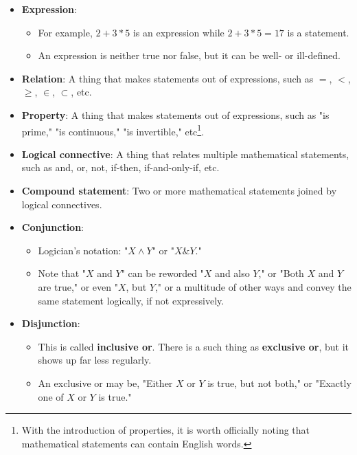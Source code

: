 \documentclass[../main.tex]{subfiles}
\begin{document}
\begin{itemize}
    \item \textbf{Expression}: 
    \begin{itemize}
        \item For example, $2+3*5$ is an expression while $2+3*5=17$ is a statement.
        \item An expression is neither true nor false, but it can be well- or ill-defined.
    \end{itemize}
    \item \textbf{Relation}: A thing that makes statements out of expressions, such as $=$, $<$, $\geq$, $\in$, $\subset$, etc.
    \item \textbf{Property}: A thing that makes statements out of expressions, such as "is prime," "is continuous," "is invertible," etc\footnote{With the introduction of properties, it is worth officially noting that mathematical statements can contain English words.}.
    \item \textbf{Logical connective}: A thing that relates multiple mathematical statements, such as and, or, not, if-then, if-and-only-if, etc.
    \item \textbf{Compound statement}: Two or more mathematical statements joined by logical connectives.
    \item \textbf{Conjunction}: 
    \begin{itemize}
        \item Logician's notation: "$X\wedge Y$" or "$X\& Y$."
        \item Note that "$X$ and $Y$" can be reworded "$X$ and also $Y$," or "Both $X$ and $Y$ are true," or even "$X$, but $Y$," or a multitude of other ways and convey the same statement logically, if not expressively.
    \end{itemize}
    \item \textbf{Disjunction}: 
    \begin{itemize}
        \item This is called \textbf{inclusive or}. There is a such thing as \textbf{exclusive or}, but it shows up far less regularly.
        \item An exclusive or may be, "Either $X$ or $Y$ is true, but not both," or "Exactly one of $X$ or $Y$ is true."

\end{itemize}
\end{itemize}
\end{document}
